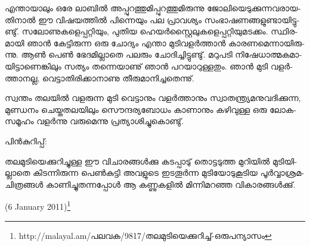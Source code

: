 എ­ന്താ­യാ­ലും ഒരേ ലാ­ബില്‍ അപ്പു­റ­ത്തു­മി­പ്പു­റ­ത്തു­മി­രു­ന്നു ജോ­ലി­യെ­ടു­ക്കു­ന്ന­വ­രാ­യ­തി­നാല്‍ ഈ വി­ഷ­യ­ത്തില്‍ പി­ന്നെ­യും 
പല പ്രാ­വ­ശ്യം സം­ഭാ­ഷ­ണ­ങ്ങ­ളു­ണ്ടാ­യി­ട്ടു­ണ്ടു്. സലോ­ണു­ക­ളെ­പ്പ­റ്റി­യും, പു­തിയ ഹെ­യര്‍­സ്റ്റൈ­ലു­ക­ളെ­പ്പ­റ്റി­യു­മ­ട­ക്കം. 
സ്ഥി­ര­മാ­യി ഞാന്‍ കേ­ട്ടി­രു­ന്ന ഒരു ചോ­ദ്യം എന്താ മു­ടി­വ­ളര്‍­ത്താന്‍ കാ­ര­ണ­മെ­ന്നാ­യി­രു­ന്നു. ആണ്‍ പെണ്‍ ഭേ­ദ­മി­ല്ലാ­തെ 
പല­രും ചോ­ദി­ച്ചി­ട്ടു­ണ്ടു്. മറു­പ­ടി നി­ഷേ­ധാ­ത്മ­ക­മാ­യി­ട്ടാ­ണെ­ങ്കി­ലും സത്യം തന്നെ­യാ­ണു് ഞാന്‍ പറ­യാ­റു­ള്ള­തും. ഞാന്‍ മു­ടി 
വളര്‍­ത്താ­ന­ല്ല, വെ­ട്ടാ­തി­രി­ക്കാ­നാ­ണു തീ­രു­മാ­നി­ച്ച­തെ­ന്നു്.

­സ്വ­ന്തം തല­യില്‍ വള­രു­ന്ന മു­ടി വെ­ട്ടാ­നും വളര്‍­ത്താ­നും സ്വാ­ത­ന്ത്ര്യ­മ­നു­വ­ദി­ക്കു­ന്ന, മു­ണ്ഡ­നം ചെ­യ്ത­ത­ല­യി­ലും 
സൌ­ന്ദ­ര്യ­ബോ­ധം കാ­ണാ­നും കഴി­വു­ള്ള ഒരു ലോ­ക­സ­മൂ­ഹം വളര്‍­ന്നു വരു­മെ­ന്നു പ്ര­ത്യാ­ശി­ച്ചു­കൊ­ണ്ടു്.

­പിന്‍­കു­റി­പ്പ്:

­ത­ല­മു­ടി­യെ­ക്കു­റി­ച്ചു­ള്ള ഈ വി­ചാ­ര­ങ്ങള്‍­ക്കു കട­പ്പാ­ടു് തൊ­ട്ട­ടു­ത്ത മു­റി­യില്‍ മു­ടി­യി­ല്ലാ­തെ കി­ട­ന്നി­രു­ന്ന പെണ്‍­കു­ട്ടി അവ­ളു­ടെ ഇട­തൂര്‍­ന്ന മു­ടി­യോ­ടു­കൂ­ടിയ പൂര്‍­വ്വാ­ശ്ര­മ­ചി­ത്ര­ങ്ങള്‍ കാ­ണി­ച്ചു­ത­ന്ന­പ്പോള്‍ ആ കണ്ണു­ക­ളില്‍ മി­ന്നി­മ­റ­ഞ്ഞ വി­കാ­ര­ങ്ങള്‍­ക്കു്.

(6 January 2011)\footnote{http://malayal.am/പലവക/9817/തലമുടിയെക്കുറിച്ച്-ഒരുപന്യാസം}

\newpage
